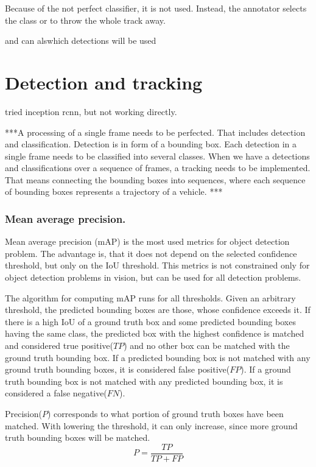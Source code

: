 \documentclass[a4paper,12pt,titlepage, twoside]{article}
\numberwithin{figure}{section}
\begin{document}
Because of the not perfect classifier, it is not used. Instead, the annotator selects the class or to throw the whole track away.


and can alswhich detections will be used



\section{Detection and tracking}
tried inception rcnn, but not working directly.

***A processing of a single frame needs to be perfected. That includes detection and classification. Detection is in form of a bounding box. Each detection in a single frame needs to be classified into several classes. When we have a detections and classifications over a sequence of frames, a tracking needs to be implemented. That means connecting the bounding boxes into sequences, where each sequence of bounding boxes represents a trajectory of a vehicle. ***



\subsubsection{Mean average precision.}
\label{sec:mAP}
Mean average precision (mAP) is the most used metrics for object detection problem. The advantage is, that it does not depend on the selected confidence threshold, but only on the IoU threshold. This metrics is not constrained only for object detection problems in vision, but can be used for all detection problems. 

The algorithm for computing mAP runs for all thresholds. Given an arbitrary threshold, the predicted bounding boxes are those, whose confidence exceeds it. If there is a high IoU of a ground truth box and some predicted bounding boxes having the same class, the predicted box with the highest confidence is matched and considered true positive($TP$) and no other box can be matched with the ground truth bounding box. If a predicted bounding box is not matched with any ground truth bounding boxes, it is considered false positive($FP$). If a ground truth bounding box is not matched with any predicted bounding box, it is considered a false negative($FN$).

Precision($P$) corresponds to what portion of ground truth boxes have been matched. With lowering the threshold, it can only increase, since more ground truth bounding boxes will be matched.
\begin{equation}
P = \frac{TP}{TP + FP}
\end{equation}
\end{document}
